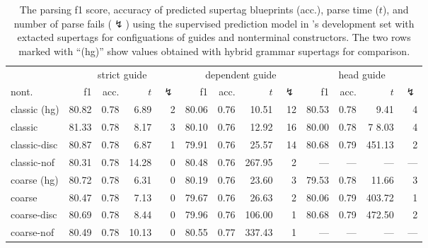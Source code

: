 \documentclass[../../document.tex]{subfiles}
\begin{document}
    \begin{table}
        \caption{\label{tbl:gridsearch:dcp:2}
        The parsing f1 score, accuracy of predicted supertag blueprints (acc.), parse time ($t$), and number of parse fails ($\lightning$) using the supervised prediction model in \negra{}'s development set with extacted  supertags for configuations of guides and nonterminal constructors. The two rows marked with ``(hg)'' show values obtained with hybrid grammar supertags for comparison.
        }
        \centering
        \setlength{\tabcolsep}{5pt}
        \vspace{.2cm}
        \begin{tabular}{l|rrrr|rrrr|rrrr}
            \toprule
                    & \multicolumn{4}{c|}{strict guide} &  \multicolumn{4}{c|}{dependent guide} &  \multicolumn{4}{c}{head guide} \\
nont.            & f1 & acc. & $t$ & $\lightning$ & f1 & acc. & $t$ & $\lightning$ & f1 & acc. & $t$ & $\lightning$ \\ \hline
\rowcolor{black!10}
classic (hg) & 80.82 & 0.78 &  6.89 & 2 & 80.06 & 0.76 &  10.51 & 12 & 80.53 & 0.78 &   9.41 & 4 \\\hline
classic      & 81.33 & 0.78 &  8.17 & 3 & 80.10 & 0.76 &  12.92 & 16 & 80.00 & 0.78 & 7 8.03 & 4 \\
classic-disc & 80.87 & 0.78 &  6.87 & 1 & 79.91 & 0.76 &  25.57 & 14 & 80.68 & 0.79 & 451.13 & 2 \\
classic-nof  & 80.31 & 0.78 & 14.28 & 0 & 80.48 & 0.76 & 267.95 &  2 &   --- &  --- &    --- & --- \\ \hline\rowcolor{black!10}
coarse (hg)  & 80.72 & 0.78 &  6.31 & 0 & 80.19 & 0.76 &  23.60 &  3 & 79.53 & 0.78 &  11.66 & 3 \\\hline
coarse       & 80.47 & 0.78 &  7.13 & 0 & 79.67 & 0.76 &  26.63 &  2 & 80.06 & 0.79 & 403.72 & 1 \\
coarse-disc  & 80.69 & 0.78 &  8.44 & 0 & 79.96 & 0.76 & 106.00 &  1 & 80.68 & 0.79 & 472.50 & 2 \\
coarse-nof   & 80.49 & 0.78 & 10.13 & 0 & 80.55 & 0.77 & 337.43 &  1 &   --- &  --- &    --- & --- \\
\bottomrule
        \end{tabular}
    \end{table}
\end{document}
